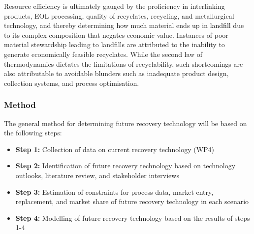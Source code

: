 Resource efficiency is ultimately gauged by the proficiency in interlinking products, EOL processing, quality of recyclates, recycling, and metallurgical technology, and thereby determining how much material ends up in landfill due to its complex composition that negates economic value. Instances of poor material stewardship leading to landfills are attributed to the inability to generate economically feasible recyclates. While the second law of thermodynamics dictates the limitations of recyclability, such shortcomings are also attributable to avoidable blunders such as inadequate product design, collection systems, and process optimisation.



\subsubsection{Method}

The general method for determining future recovery technology will be based on the following steps:

\begin{itemize}
    \item \textbf{Step 1:} Collection of data on current recovery technology (WP4)
    \item \textbf{Step 2:} Identification of future recovery technology based on technology outlooks, literature review, and stakeholder interviews
    \item \textbf{Step 3:} Estimation of constraints for process data, market entry, replacement, and market share of future recovery technology in each scenario
    \item \textbf{Step 4:} Modelling of future recovery technology based on the results of steps 1-4
\end{itemize}


% 


